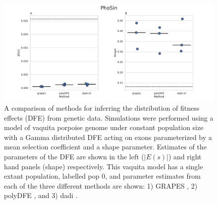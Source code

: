 \documentclass[hidelinks]{article}
\newcommand{\stopsupplement}{%
        \setcounter{table}{0}
        \renewcommand{\thetable}{\arabic{table}}%
        \setcounter{figure}{0}
        \renewcommand{\thefigure}{\arabic{figure}}%
     }
\begin{document}
\begin{figure}
    \centering
    \includegraphics[width=\textwidth]{figures/PhoSin/Constant/PhoSin_Constant_Gamma_R22_Phocoena_sinus.mPhoSin1.pri.110_exons_DFE_plot.pdf}
    \caption{
    \label{fig:vaquita-dfe.constant}
    A comparison of methods for inferring the distribution of fitness effects (DFE) from genetic data.
    Simulations were performed using a model of vaquita porpoise genome under constant population size with a Gamma distributed DFE
    acting on exons parameterized by a mean selection coefficient and a shape parameter. Estimates of the 
    parameters of the DFE are shown in the left ($\lvert E(s) \rvert $) and right hand panels (shape) respectively.
    This vaquita model has a single extant population, labelled pop 0, and parameter estimates from each
    of the three different methods are shown: 1) GRAPES \cite{galtier2016adaptive}, 2) polyDFE \citep{tataru2020polydfe},
    and 3) dadi \citep{gutenkunst2009inferring}.}
\end{figure}
\stopsupplement
\end{document}

